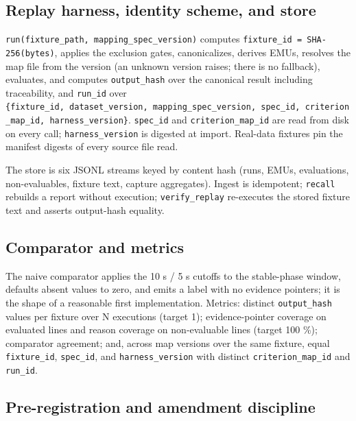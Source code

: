 \documentclass[11pt]{article}
\begin{document}
\subsection{Replay harness, identity scheme, and store}\label{replay-harness-identity-scheme-and-store}

\texttt{run(fixture\_path,\ mapping\_spec\_version)} computes \texttt{fixture\_id\ =\ SHA-256(bytes)}, applies the exclusion gates, canonicalizes, derives EMUs, resolves the map file from the version (an unknown version raises; there is no fallback), evaluates, and computes \texttt{output\_hash} over the canonical result including traceability, and \texttt{run\_id} over \texttt{\{fixture\_id,\ dataset\_version,\ mapping\_spec\_version,\ spec\_id,\ criterion\_map\_id,\ harness\_version\}}. \texttt{spec\_id} and \texttt{criterion\_map\_id} are read from disk on every call; \texttt{harness\_version} is digested at import. Real-data fixtures pin the manifest digests of every source file read.

The store is six JSONL streams keyed by content hash (runs, EMUs, evaluations, non-evaluables, fixture text, capture aggregates). Ingest is idempotent; \texttt{recall} rebuilds a report without execution; \texttt{verify\_replay} re-executes the stored fixture text and asserts output-hash equality.

\subsection{Comparator and metrics}\label{comparator-and-metrics}

The naive comparator applies the 10 s / 5 s cutoffs to the stable-phase window, defaults absent values to zero, and emits a label with no evidence pointers; it is the shape of a reasonable first implementation. Metrics: distinct \texttt{output\_hash} values per fixture over N executions (target 1); evidence-pointer coverage on evaluated lines and reason coverage on non-evaluable lines (target 100 \%); comparator agreement; and, across map versions over the same fixture, equal \texttt{fixture\_id}, \texttt{spec\_id}, and \texttt{harness\_version} with distinct \texttt{criterion\_map\_id} and \texttt{run\_id}.

\subsection{Pre-registration and amendment discipline}\label{pre-registration-and-amendment-discipline}
\end{document}
